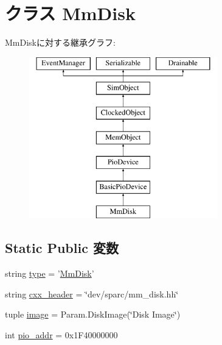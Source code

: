 \hypertarget{classT1000_1_1MmDisk}{
\section{クラス MmDisk}
\label{classT1000_1_1MmDisk}
}
MmDiskに対する継承グラフ:\begin{figure}[H]
\begin{center}
\leavevmode
\includegraphics[height=7cm]{classT1000_1_1MmDisk}
\end{center}
\end{figure}
\subsection*{Static Public 変数}
\begin{DoxyCompactItemize}
\item 
string \hyperlink{classT1000_1_1MmDisk_acce15679d830831b0bbe8ebc2a60b2ca}{type} = '\hyperlink{classT1000_1_1MmDisk}{MmDisk}'
\item 
string \hyperlink{classT1000_1_1MmDisk_a17da7064bc5c518791f0c891eff05fda}{cxx\_\-header} = \char`\"{}dev/sparc/mm\_\-disk.hh\char`\"{}
\item 
tuple \hyperlink{classT1000_1_1MmDisk_a19b24a8d47d783aaa13170884d6a25c2}{image} = Param.DiskImage(\char`\"{}Disk Image\char`\"{})
\item 
int \hyperlink{classT1000_1_1MmDisk_a659450bdbf05cdba8edf24c47df67671}{pio\_\-addr} = 0x1F40000000
\end{DoxyCompactItemize}


